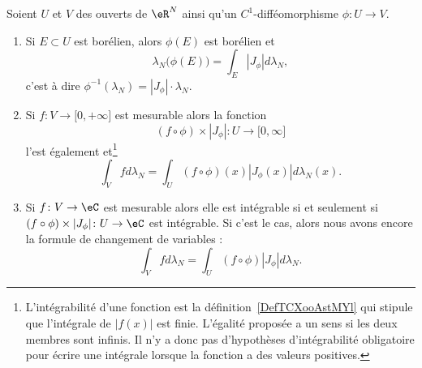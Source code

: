 \begin{theorem}         \label{THOooUMIWooZUtUSg}
    Soient \( U\) et \( V\) des ouverts de \( \eR^N\) ainsi qu'un \( C^1\)-difféomorphisme \(\phi\colon U\to V\).
    \begin{enumerate}
        \item   \label{ItemVWYDooOzwnyfi}
            Si \( E\subset U\) est borélien, alors \( \phi(E)\) est borélien et
            \begin{equation}
                \lambda_N\big( \phi(E) \big)=\int_E| J_{\phi} |d\lambda_N,
            \end{equation}
            c'est à dire \( \phi^{-1}(\lambda_N)=| J_{\phi} |\cdot \lambda_N\).
        \item       \label{ITEMooEZUBooGBuDOS}
            Si \( f\colon V\to \mathopen[ 0 , +\infty \mathclose]\) est mesurable alors la fonction
            \begin{equation}
                (f\circ\phi)\times | J_{\phi} |\colon U\to \mathopen[ 0 , \infty \mathclose]
            \end{equation}
            l'est également et\footnote{L'intégrabilité d'une fonction est la définition~\ref{DefTCXooAstMYl} qui stipule que l'intégrale de \( | f(x) |\) est finie. L'égalité proposée a un sens si les deux membres sont infinis. Il n'y a donc pas d'hypothèses d'intégrabilité obligatoire pour écrire une intégrale lorsque la fonction a des valeurs positives.}
            \begin{equation}        \label{EqRANEooQsFhbC}
                \int_Vfd\lambda_N=\int_U(f\circ\phi)(x)| J_{\phi}(x) |d\lambda_N(x).
            \end{equation}
        \item       \label{ITEMooAJGDooGHKnvj}
            Si \( f\colon V\to \eC\) est mesurable alors elle est intégrable si et seulement si \( (f\circ \phi)\times | J_{\phi} |\colon U\to \eC\) est intégrable. Si c'est le cas, alors nous avons encore la formule de changement de variables :
            \begin{equation}        \label{EQooLYAWooTArAZR}
                \int_Vfd\lambda_N=\int_U (f\circ \phi)| J_{\phi} |d\lambda_N.
            \end{equation}
    \end{enumerate}
\end{theorem}


